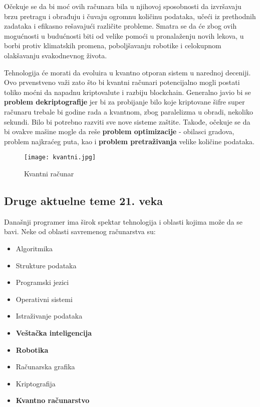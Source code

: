 \documentclass[a4paper]{article}
\begin{document}
{Očekuje se da bi moć ovih računara bila u njihovoj sposobnosti da izvršavaju brzu pretragu i obrađuju i čuvaju ogromnu količinu podataka, učeći iz prethodnih zadataka i efikasno rešavajući različite probleme. Smatra se da će zbog ovih mogućnosti u budućnosti biti od velike pomoći u pronalaženju novih lekova, u borbi protiv klimatskih promena, poboljšavanju robotike i celokupnom olakšavanju svakodnevnog života.

Tehnologija će morati da evoluira u kvantno otporan sistem u narednoj deceniji. Ovo prvenstveno važi zato što bi kvantni računari potencijalno mogli postati toliko moćni da napadnu kriptovalute i razbiju blockchain. Generalno javio bi se {\bf problem dekriptografije} jer bi za probijanje bilo koje
kriptovane šifre super računaru trebale bi godine rada
a kvantnom, zbog paralelizma u obradi, nekoliko
sekundi.  Bilo bi potrebno razviti sve nove sisteme zaštite.
Takođe, očekuje se da bi ovakve mašine mogle da reše {\bf problem optimizacije  }-
obilasci gradova, problem najkraćeg puta, kao i {\bf problem pretraživanja} velike količine podataka. 

\begin{figure}[h!]
\begin{center}
\texttt{[image: kvantni.jpg]}
\end{center}
\caption{Kvantni računar}
\label{fig:kvant}
\end{figure}

\setlength{\parskip}{1em}


\subsection{ Druge aktuelne teme 21. veka}	
Današnji programer ima širok spektar tehnologija i oblasti kojima može da se bavi. Neke od oblasti savremenog računarstva su:

		\begin{itemize}
		    \item Algoritmika 
\item Strukture podataka 
\item Programski jezici 
\item Operativni sistemi 
\item Istraživanje podataka 
\item \textbf{Veštačka inteligencija }
\item \textbf{Robotika} 
\item Računarska grafika 
\item Kriptografija 
\item\textbf{Kvantno računarstvo} 


\end{itemize}}
\end{document}
